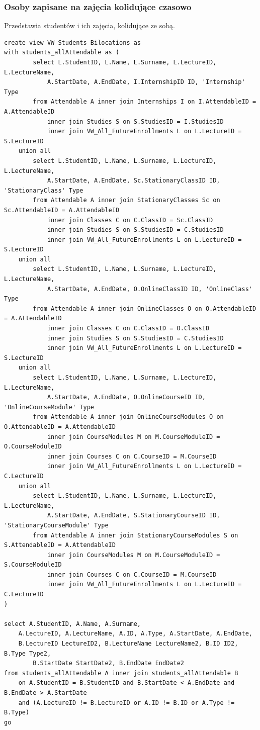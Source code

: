 \documentclass[11pt,a4paper]{article}
\begin{document}
\subsubsection{Osoby zapisane na zajęcia kolidujące czasowo}
Przedstawia studentów i ich zajęcia, kolidujące ze sobą.
\begin{Verbatim}[breaklines=true]
create view VW_Students_Bilocations as
with students_allAttendable as (
        select L.StudentID, L.Name, L.Surname, L.LectureID, L.LectureName, 
            A.StartDate, A.EndDate, I.InternshipID ID, 'Internship' Type
        from Attendable A inner join Internships I on I.AttendableID = A.AttendableID
            inner join Studies S on S.StudiesID = I.StudiesID
            inner join VW_All_FutureEnrollments L on L.LectureID = S.LectureID
    union all
        select L.StudentID, L.Name, L.Surname, L.LectureID, L.LectureName,
            A.StartDate, A.EndDate, Sc.StationaryClassID ID, 'StationaryClass' Type
        from Attendable A inner join StationaryClasses Sc on Sc.AttendableID = A.AttendableID
            inner join Classes C on C.ClassID = Sc.ClassID
            inner join Studies S on S.StudiesID = C.StudiesID
            inner join VW_All_FutureEnrollments L on L.LectureID = S.LectureID
    union all
        select L.StudentID, L.Name, L.Surname, L.LectureID, L.LectureName,
            A.StartDate, A.EndDate, O.OnlineClassID ID, 'OnlineClass' Type
        from Attendable A inner join OnlineClasses O on O.AttendableID = A.AttendableID
            inner join Classes C on C.ClassID = O.ClassID
            inner join Studies S on S.StudiesID = C.StudiesID
            inner join VW_All_FutureEnrollments L on L.LectureID = S.LectureID
    union all
        select L.StudentID, L.Name, L.Surname, L.LectureID, L.LectureName,
            A.StartDate, A.EndDate, O.OnlineCourseID ID, 'OnlineCourseModule' Type
        from Attendable A inner join OnlineCourseModules O on O.AttendableID = A.AttendableID
            inner join CourseModules M on M.CourseModuleID = O.CourseModuleID
            inner join Courses C on C.CourseID = M.CourseID
            inner join VW_All_FutureEnrollments L on L.LectureID = C.LectureID
    union all
        select L.StudentID, L.Name, L.Surname, L.LectureID, L.LectureName,
            A.StartDate, A.EndDate, S.StationaryCourseID ID, 'StationaryCourseModule' Type
        from Attendable A inner join StationaryCourseModules S on S.AttendableID = A.AttendableID
            inner join CourseModules M on M.CourseModuleID = S.CourseModuleID
            inner join Courses C on C.CourseID = M.CourseID
            inner join VW_All_FutureEnrollments L on L.LectureID = C.LectureID
)

select A.StudentID, A.Name, A.Surname, 
    A.LectureID, A.LectureName, A.ID, A.Type, A.StartDate, A.EndDate, 
    B.LectureID LectureID2, B.LectureName LectureName2, B.ID ID2, B.Type Type2,
        B.StartDate StartDate2, B.EndDate EndDate2
from students_allAttendable A inner join students_allAttendable B
    on A.StudentID = B.StudentID and B.StartDate < A.EndDate and B.EndDate > A.StartDate
    and (A.LectureID != B.LectureID or A.ID != B.ID or A.Type != B.Type)
go
\end{Verbatim}
\end{document}
